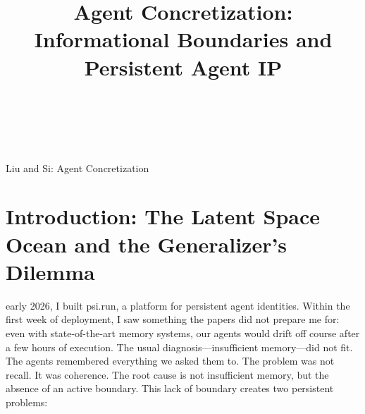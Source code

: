 \documentclass[10pt,journal,compsoc]{IEEEtran}
\begin{document}
\title{Agent Concretization: Informational Boundaries and Persistent Agent IP}

\author{
     \\
     \\
}

%
{Liu and Si: Agent Concretization}


\maketitle
\IEEEdisplaynontitleabstractindextext
\IEEEpeerreviewmaketitle

\section{Introduction: The Latent Space Ocean and the Generalizer's Dilemma}
 early 2026, I built psi.run, a platform for persistent agent identities. Within the first week of deployment, I saw something the papers did not prepare me for: even with state-of-the-art memory systems, our agents would drift off course after a few hours of execution. The usual diagnosis---insufficient memory---did not fit. The agents remembered everything we asked them to. The problem was not recall. It was coherence. The root cause is not insufficient memory, but the absence of an active boundary. This lack of boundary creates two persistent problems:
\end{document}
